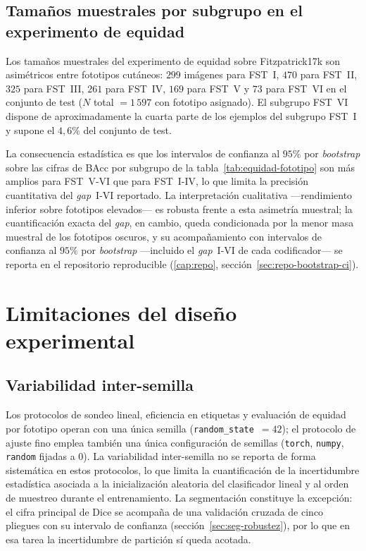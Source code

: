 \subsection{Tamaños muestrales por subgrupo en el experimento de equidad}
\label{sec:lim-muestrales}

Los tamaños muestrales del experimento de equidad sobre
Fitzpatrick17k son asimétricos entre fototipos cutáneos: $299$
imágenes para FST~I, $470$ para FST~II, $325$ para FST~III,
$261$ para FST~IV, $169$ para FST~V y $73$ para FST~VI
en el conjunto de test ($N$ total $=1\,597$ con fototipo
asignado). El subgrupo FST~VI dispone de aproximadamente la cuarta
parte de los ejemplos del subgrupo FST~I y supone el $4{,}6\%$
del conjunto de test.

La consecuencia estadística es que los intervalos de confianza al
$95\%$ por \emph{bootstrap} sobre las cifras de
BAcc por subgrupo de la tabla~\ref{tab:equidad-fototipo} son más
amplios para FST~V-VI que para FST~I-IV, lo que limita la
precisión cuantitativa del \emph{gap}~I-VI reportado. La
interpretación cualitativa ---rendimiento inferior sobre fototipos
elevados--- es robusta frente a esta asimetría muestral; la
cuantificación exacta del \emph{gap}, en cambio, queda condicionada
por la menor masa muestral de los fototipos oscuros, y su
acompañamiento con intervalos de confianza al $95\%$ por
\emph{bootstrap} ---incluido el \emph{gap}~I-VI de cada codificador---
se reporta en el repositorio reproducible (\ref{cap:repo},
sección~\ref{sec:repo-bootstrap-ci}).

\section{Limitaciones del diseño experimental}
\label{sec:lim-diseno}

\subsection{Variabilidad inter-semilla}
\label{sec:lim-semilla}

Los protocolos de sondeo lineal, eficiencia en etiquetas y
evaluación de equidad por fototipo operan con una única semilla
(\texttt{random\_state}~$=42$); el protocolo de ajuste fino emplea
también una única configuración de
semillas (\texttt{torch}, \texttt{numpy}, \texttt{random} fijadas a
$0$). La variabilidad inter-semilla no se reporta de forma
sistemática en estos protocolos, lo que limita la cuantificación de
la incertidumbre estadística asociada a la inicialización aleatoria
del clasificador lineal y al orden de muestreo durante el
entrenamiento. La segmentación constituye la excepción: el
cifra principal de Dice se acompaña de una validación cruzada de
cinco pliegues con su intervalo de confianza
(sección~\ref{sec:seg-robustez}), por lo que en esa tarea la
incertidumbre de partición sí queda acotada.

